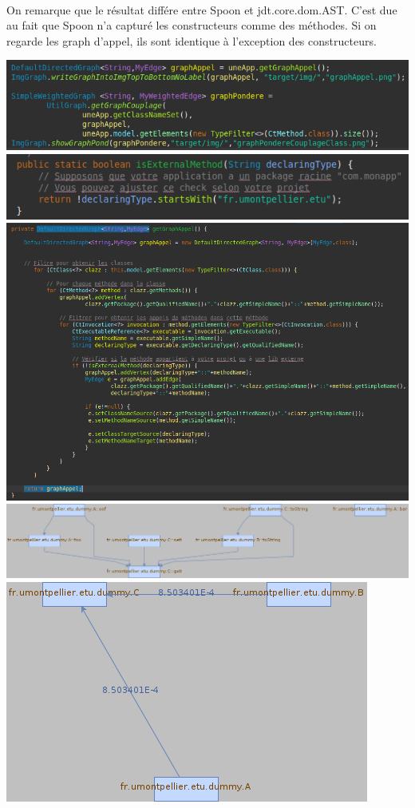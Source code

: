 \documentclass[a4paper]{article}
\begin{document}
\begin{multicols}{2}
        \paragraph{} On remarque que le résultat différe entre Spoon et jdt.core.dom.AST. C'est due au fait que Spoon n'a capturé les constructeurs comme des méthodes. Si on regarde les graph d'appel, ils sont identique à l'exception des constructeurs.

        \noindent\includegraphics[width=.46\textwidth]{spoon/code}
        \noindent\includegraphics[width=.46\textwidth]{spoon/isExternalMethod}
        \noindent\includegraphics[width=.46\textwidth]{spoon/getGraphAppel}
        \noindent\includegraphics[width=.46\textwidth]{spoon/graphAppel}
        \noindent\includegraphics[width=.46\textwidth]{spoon/graphPondereCouplageClass}
    \end{multicols}
\end{document}
